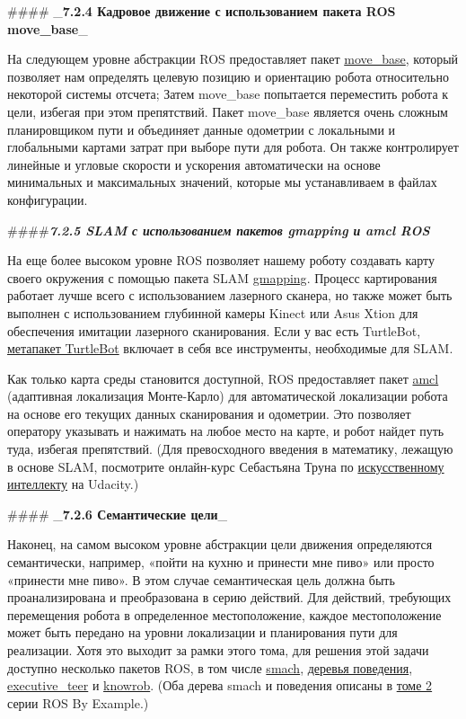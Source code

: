 ####  _\textbf{7.2.4 Кадровое движение с использованием пакета ROS move\_base}_

На следующем уровне абстракции ROS предоставляет пакет \href{http://wiki.ros.org/move_base}{move\_base}, который позволяет нам определять целевую позицию и ориентацию робота относительно некоторой системы отсчета; Затем move\_base попытается переместить робота к цели, избегая при этом препятствий. Пакет move\_base является очень сложным планировщиком пути и объединяет данные одометрии с локальными и глобальными картами затрат при выборе пути для робота. Он также контролирует линейные и угловые скорости и ускорения автоматически на основе минимальных и максимальных значений, которые мы устанавливаем в файлах конфигурации. 

####\textit{\textbf{7.2.5 SLAM с использованием пакетов gmapping и amcl ROS}}

На еще более высоком уровне ROS позволяет нашему роботу создавать карту своего окружения с помощью пакета SLAM \href{http://wiki.ros.org/gmapping}{gmapping}. Процесс картирования работает лучше всего с использованием лазерного сканера, но также может быть выполнен с использованием глубинной камеры Kinect или Asus Xtion для обеспечения имитации лазерного сканирования. Если у вас есть TurtleBot, \href{http://ros.org/wiki/Robots/TurtleBot}{метапакет TurtleBot} включает в себя все инструменты, необходимые для SLAM. 

Как только карта среды становится доступной, ROS предоставляет пакет \href{http://wiki.ros.org/amcl}{amcl} (адаптивная локализация Монте-Карло) для автоматической локализации робота на основе его текущих данных сканирования и одометрии. Это позволяет оператору указывать и нажимать на любое место на карте, и робот найдет путь туда, избегая препятствий. (Для превосходного введения в математику, лежащую в основе SLAM, посмотрите онлайн-курс Себастьяна Труна по \href{http://www.udacity.com/overview/Course/cs373/CourseRev/apr2012}{искусственному интеллекту} на Udacity.)

#### _\textbf{7.2.6 Семантические цели}_

 Наконец, на самом высоком уровне абстракции цели движения определяются семантически, например, «пойти на кухню и принести мне пиво» или просто «принести мне пиво». В этом случае семантическая цель должна быть проанализирована и преобразована в серию действий. Для действий, требующих перемещения робота в определенное местоположение, каждое местоположение может быть передано на уровни локализации и планирования пути для реализации. Хотя это выходит за рамки этого тома, для решения этой задачи доступно несколько пакетов ROS, в том числе \href{http://wiki.ros.org/executive_smach}{smach}, \href{http://wiki.ros.org/pi_trees}{деревья поведения}, \href{http://wiki.ros.org/executive_teer}{executive\_teer} и \href{http://wiki.ros.org/knowrob}{knowrob}. (Оба дерева smach и поведения описаны в \href{http://www.pirobot.org/wordpress/}{томе 2} серии ROS By Example.)

